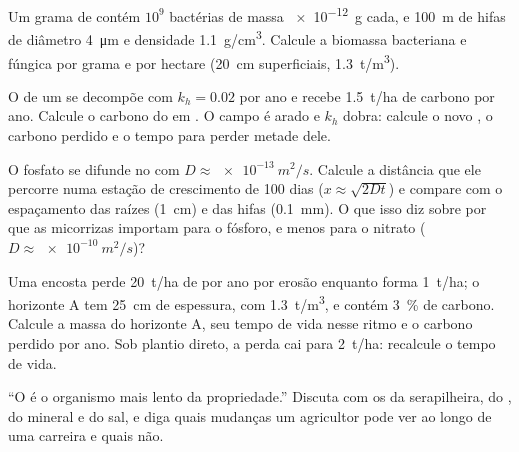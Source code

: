 \begin{exercise}[$\star\star$]\label{exo:b2:living-soil:8}
Um grama de  contém $10^{9}$ bactérias de massa \qty{e-12}{g} cada,
e \qty{100}{m} de hifas de diâmetro \qty{4}{\micro m} e densidade
\qty{1.1}{g/cm^3}. Calcule a biomassa bacteriana e fúngica por grama e
por hectare (\qty{20}{cm} superficiais, \qty{1.3}{t/m^3}).
\end{exercise}

\begin{exercise}[$\star\star$]\label{exo:b2:living-soil:9}
O  de um  se decompõe com $k_h = 0.02$ por ano e recebe
\qty{1.5}{t/ha} de carbono por ano. Calcule o carbono do  em . O campo é arado e $k_h$ dobra: calcule o novo , o carbono perdido e o tempo para perder metade dele.
\end{exercise}

\begin{exercise}[$\star\star\star$]\label{exo:b2:living-soil:10}
O fosfato se difunde no  com $D \approx \qty{e-13}{m^2/s}$.
Calcule a distância que ele percorre numa estação de crescimento de
\num{100} dias ($x \approx \sqrt{2Dt}$) e compare com o espaçamento das
raízes (\qty{1}{cm}) e das hifas (\qty{0.1}{mm}). O que isso diz sobre
por que as micorrizas importam para o fósforo, e menos para o nitrato
($D \approx \qty{e-10}{m^2/s}$)?
\end{exercise}

\begin{exercise}[$\star\star\star$]\label{exo:b2:living-soil:11}
Uma encosta perde \qty{20}{t/ha} de  por ano por erosão enquanto
forma \qty{1}{t/ha}; o horizonte A tem \qty{25}{cm} de espessura, com
\qty{1.3}{t/m^3}, e contém \qty{3}{\%} de carbono. Calcule a massa do
horizonte A, seu tempo de vida nesse ritmo e o carbono perdido por ano.
Sob plantio direto, a perda cai para \qty{2}{t/ha}: recalcule o tempo de
vida.
\end{exercise}

\begin{exercise}[$\star\star\star$]\label{exo:b2:living-soil:12}
``O  é o organismo mais lento da propriedade.'' Discuta com os
 da serapilheira, do , do  mineral e do sal,
e diga quais mudanças um agricultor pode ver ao longo de uma carreira e
quais não.
\end{exercise}

